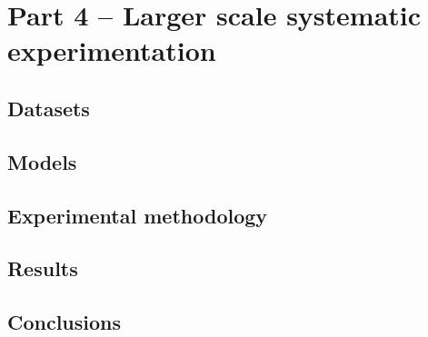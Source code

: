 \section{Part 4 -- Larger scale systematic experimentation}

\subsection{Datasets}

\subsection{Models}

\subsection{Experimental methodology}

\subsection{Results}

\subsection{Conclusions}
